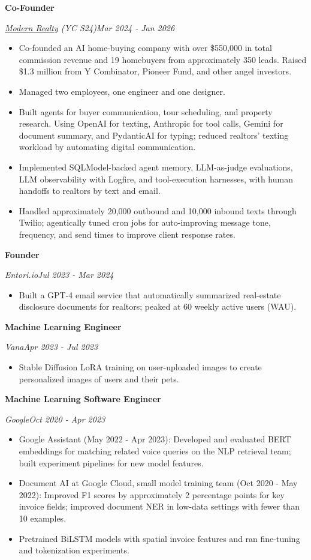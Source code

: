 \documentclass[11pt,letterpaper]{article}
\let\ResumeOriginalHref\href
\renewcommand{\href}[2]{\ResumeOriginalHref{#1}{\underline{#2}}}
\newcommand{\ResumeRole}[3]{%
  \par\addvspace{3pt}\Needspace{49pt}%
  {\fontsize{11}{13}\selectfont\bfseries #1\par}%
  {\itshape #2\hfill\upshape #3\par}\nopagebreak}
\newenvironment{ResumeItems}{%
  \begin{itemize}[label={\raisebox{0.15ex}{\fontsize{7}{7}\selectfont\rmfamily\textbullet}},leftmargin=11pt,labelsep=5pt,
    topsep=1.5pt,itemsep=0.7pt,parsep=0pt,partopsep=0pt]}{\end{itemize}}
\begin{document}
\ResumeRole{Co-Founder}{\href{https://news.ycombinator.com/item?id=41638199}{Modern Realty} (YC S24)}{Mar 2024 - Jan 2026}
\begin{ResumeItems}
\item Co-founded an AI home-buying company with over \$550,000 in total commission revenue and 19 homebuyers from approximately 350 leads. Raised \$1.3 million from Y Combinator, Pioneer Fund, and other angel investors.
\item Managed two employees, one engineer and one designer.
\item Built agents for buyer communication, tour scheduling, and property research. Using OpenAI for texting, Anthropic for tool calls, Gemini for document summary, and PydanticAI for typing; reduced realtors' texting workload by automating digital communication.
\item Implemented SQLModel-backed agent memory, LLM-as-judge evaluations, LLM observability with Logfire, and tool-execution harnesses, with human handoffs to realtors by text and email.
\item Handled approximately 20,000 outbound and 10,000 inbound texts through Twilio; agentically tuned cron jobs for auto-improving message tone, frequency, and send times to improve client response rates.
\end{ResumeItems}
\ResumeRole{Founder}{Entori.io}{Jul 2023 - Mar 2024}
\begin{ResumeItems}
\item Built a GPT-4 email service that automatically summarized real-estate disclosure documents for realtors; peaked at 60 weekly active users (WAU).
\end{ResumeItems}
\ResumeRole{Machine Learning Engineer}{Vana}{Apr 2023 - Jul 2023}
\begin{ResumeItems}
\item Stable Diffusion LoRA training on user-uploaded images to create personalized images of users and their pets.
\end{ResumeItems}
\ResumeRole{Machine Learning Software Engineer}{Google}{Oct 2020 - Apr 2023}
\begin{ResumeItems}
\item Google Assistant (May 2022 - Apr 2023): Developed and evaluated BERT embeddings for matching related voice queries on the NLP retrieval team; built experiment pipelines for new model features.
\item Document AI at Google Cloud, small model training team (Oct 2020 - May 2022): Improved F1 scores by approximately 2 percentage points for key invoice fields; improved document NER in low-data settings with fewer than 10 examples.
\item Pretrained BiLSTM models with spatial invoice features and ran fine-tuning and tokenization experiments.
\end{ResumeItems}
\end{document}
